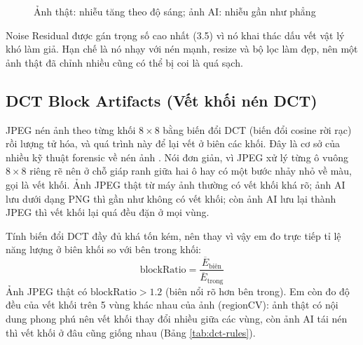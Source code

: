 \documentclass[14pt,a4paper,oneside]{report}
\begin{document}
\begin{figure}[H]
\centering
{}
\caption{Ảnh thật: nhiễu tăng theo độ sáng; ảnh AI: nhiễu gần như phẳng}
\label{fig:noise-shot}
\end{figure}

Noise Residual được gán trọng số cao nhất (3.5) vì nó khai thác dấu vết vật lý khó làm giả. Hạn chế là nó nhạy với nén mạnh, resize và bộ lọc làm đẹp, nên một ảnh thật đã chỉnh nhiều cũng có thể bị coi là quá sạch.

\subsection{DCT Block Artifacts (Vết khối nén DCT)}
JPEG nén ảnh theo từng khối $8\times8$ bằng biến đổi DCT (biến đổi cosine rời rạc) rồi lượng tử hóa, và quá trình này để lại vết ở biên các khối. Đây là cơ sở của nhiều kỹ thuật forensic về nén ảnh \cite{popescu,fridrich2009}. Nói đơn giản, vì JPEG xử lý từng ô vuông $8\times8$ riêng rẽ nên ở chỗ giáp ranh giữa hai ô hay có một bước nhảy nhỏ về màu, gọi là vết khối. Ảnh JPEG thật từ máy ảnh thường có vết khối khá rõ; ảnh AI lưu dưới dạng PNG thì gần như không có vết khối; còn ảnh AI lưu lại thành JPEG thì vết khối lại quá đều đặn ở mọi vùng.

Tính biến đổi DCT đầy đủ khá tốn kém, nên thay vì vậy em đo trực tiếp tỉ lệ năng lượng ở biên khối so với bên trong khối:
\[
\text{blockRatio}=\frac{\overline{E}_{\text{biên}}}{\overline{E}_{\text{trong}}}
\]
Ảnh JPEG thật có $\text{blockRatio}>1.2$ (biên nổi rõ hơn bên trong). Em còn đo độ đều của vết khối trên 5 vùng khác nhau của ảnh ($\text{regionCV}$): ảnh thật có nội dung phong phú nên vết khối thay đổi nhiều giữa các vùng, còn ảnh AI tái nén thì vết khối ở đâu cũng giống nhau (Bảng \ref{tab:dct-rules}).
\end{document}
